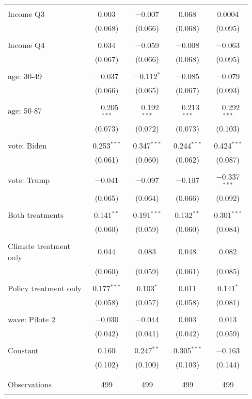 \begin{tabular}{@{\extracolsep{5pt}}lcccc}
  & & & & \\ 
 Income Q3 & 0.003 & $-$0.007 & 0.068 & 0.0004 \\ 
  & (0.068) & (0.066) & (0.068) & (0.095) \\ 
  & & & & \\ 
 Income Q4 & 0.034 & $-$0.059 & $-$0.008 & $-$0.063 \\ 
  & (0.067) & (0.066) & (0.068) & (0.095) \\ 
  & & & & \\ 
 age: 30-49 & $-$0.037 & $-$0.112$^{*}$ & $-$0.085 & $-$0.079 \\ 
  & (0.066) & (0.065) & (0.067) & (0.093) \\ 
  & & & & \\ 
 age: 50-87 & $-$0.205$^{***}$ & $-$0.192$^{***}$ & $-$0.213$^{***}$ & $-$0.292$^{***}$ \\ 
  & (0.073) & (0.072) & (0.073) & (0.103) \\ 
  & & & & \\ 
 vote: Biden & 0.253$^{***}$ & 0.347$^{***}$ & 0.244$^{***}$ & 0.424$^{***}$ \\ 
  & (0.061) & (0.060) & (0.062) & (0.087) \\ 
  & & & & \\ 
 vote: Trump & $-$0.041 & $-$0.097 & $-$0.107 & $-$0.337$^{***}$ \\ 
  & (0.065) & (0.064) & (0.066) & (0.092) \\ 
  & & & & \\ 
 Both treatments & 0.141$^{**}$ & 0.191$^{***}$ & 0.132$^{**}$ & 0.301$^{***}$ \\ 
  & (0.060) & (0.059) & (0.060) & (0.084) \\ 
  & & & & \\ 
 Climate treatment only & 0.044 & 0.083 & 0.048 & 0.082 \\ 
  & (0.060) & (0.059) & (0.061) & (0.085) \\ 
  & & & & \\ 
 Policy treatment only & 0.177$^{***}$ & 0.103$^{*}$ & 0.011 & 0.141$^{*}$ \\ 
  & (0.058) & (0.057) & (0.058) & (0.081) \\ 
  & & & & \\ 
 wave: Pilote 2 & $-$0.030 & $-$0.044 & 0.003 & 0.013 \\ 
  & (0.042) & (0.041) & (0.042) & (0.059) \\ 
  & & & & \\ 
 Constant & 0.160 & 0.247$^{**}$ & 0.305$^{***}$ & $-$0.163 \\ 
  & (0.102) & (0.100) & (0.103) & (0.144) \\ 
  & & & & \\ 
\hline \\[-1.8ex] 

Observations & 499 & 499 & 499 & 499 \\ 
\hline 
\hline \\[-1.8ex] 
\end{tabular} 